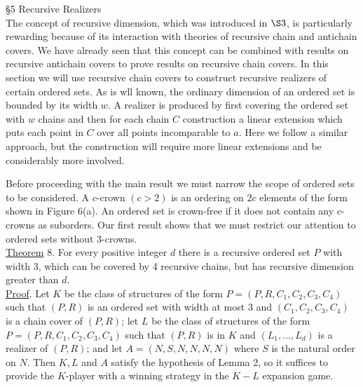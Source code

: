 \documentclass[twoside]{article}
\begin{document}
\noindent\S 5 Recursive Realizers\\


The concept of recursive dimension, which was introduced in $\S 3$, is particularly
rewarding because of its interaction with theories of recursive chain and antichain covers.
We have already seen that this concept can be combined with results on recursive antichain covers to prove results
on recursive chain covers. In this section we will use recursive chain covers to construct
recursive realizers of certain ordered sets. As is wll known, the ordinary dimension
of an ordered set is bounded by its width $w$. A realizer is produced by first covering the ordered set with 
$w$ chains and then for each chain $C$ construction a linear extension which puts each point in 
$C$ over all points incomparable to $a$. Here we follow a similar approach, but the construction
will require more linear extensions and be considerably more involved.

%
%
Before proceeding with the main result we must narrow the scope of ordered
sets to be considered. A $c$-crown $(c>2)$ is an ordering on $2c$ elements
of the form shown in Figure 6(a). An ordered set is crown-free
if it does not contain any $c$-crowns as suborders. Our first result shows that we must restrict our
attention to ordered sets without 3-crowns.\\
\newline
\underline{Theorem} 8. \cite{KiersteadMcNultyTrotter84} For every positive integer $d$ there is a 
recursive ordered set $P$ with width 3, which can be covered by 4 recursive chains,
but has recursive dimension greater than $d$.\\
\newline
\underline{Proof}. Let $K$ be the class of structures of the form
$P=(P,R,C_1,C_2,C_3,C_4)$ such that $(P,R)$ is an ordered set with width at most 3 and 
$(C_1,C_2,C_3,C_4)$ is a chain cover of $(P,R)$; let $L$ be the class of structures
of the form $P=(P,R,C_1,C_2,C_3,C_4)$ such that $(P,R)$ is in $K$ and
$(L_1,...,L_d)$ is a realizer of $(P,R)$; and let $A=(N,S,N,N,N,N)$ where
$S$ is the natural order on $N$. Then $K,L$ and $A$ satisfy the hypothesis 
of Lemma 2, so it suffices to provide the $K$-player with a winning strategy
in the $K-L$ expansion game.
\end{document}
